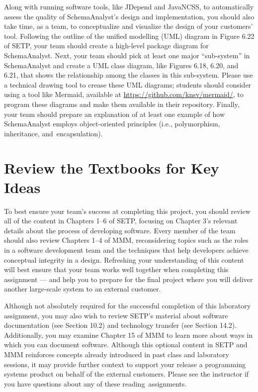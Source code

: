 Along with running software tools, like JDepend and JavaNCSS, to automatically assess the quality of SchemaAnalyst's
design and implementation, you should also take time, as a team, to conceptualize and visualize the design of your
customers' tool. Following the outline of the unified modelling (UML) diagram in Figure 6.22 of SETP, your team should
create a high-level package diagram for SchemaAnalyst. Next, your team should pick at least one major ``sub-system'' in
SchemaAnalyst and create a UML class diagram, like Figures 6.18, 6.20, and 6.21, that shows the relationship among the
classes in this sub-system. Please use a technical drawing tool to crease these UML diagrams; students should consider
using a tool like Mermaid, available at \url{https://github.com/knsv/mermaid/}, to program these diagrams and make them
available in their repository. Finally, your team should prepare an explanation of at least one example of how
SchemaAnalyst employs object-oriented principles (i.e., polymorphism, inheritance, \mbox{and encapsulation)}.

\section*{Review the Textbooks for Key Ideas}

To best ensure your team's success at completing this project, you should review all of the content in Chapters 1--6 of
SETP, focusing on Chapter 3's relevant details about the process of developing software. Every member of the team should
also review Chapters 1--4 of MMM, reconsidering topics such as the roles in a software development team and the
techniques that help developers achieve conceptual integrity in a design. Refreshing your understanding of this content
will best ensure that your team works well together when completing this assignment --- and help you to prepare for the
final project where you will deliver another large-scale system to an external customer.

Although not absolutely required for the successful completion of this laboratory assignment, you may also wish to
review SETP's material about software documentation (see Section 10.2) and technology transfer (see Section 14.2).
Additionally, you may examine Chapter 15 of MMM to learn more about ways in which you can document software. Although
this optional content in SETP and MMM reinforces concepts already introduced in past class and laboratory sessions, it
may provide further context to support your release a programming systems product on behalf of the external customers.
Please see the instructor if you have questions about any of these \mbox{reading assignments}.

